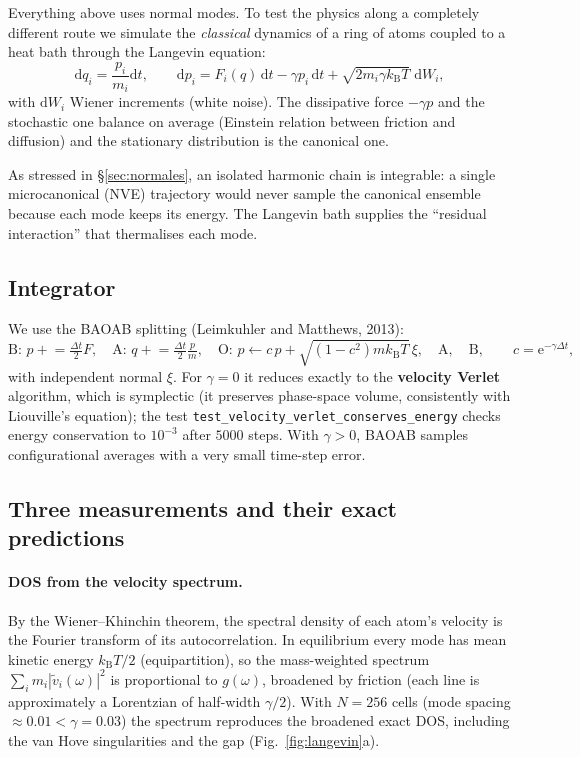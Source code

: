\documentclass[11pt,a4paper]{article}
\newcommand{\kB}{k_{\mathrm B}}
\newcommand{\dd}{\mathrm{d}}
\newcommand{\ee}{\mathrm{e}}
\newcommand{\code}[1]{\texttt{#1}}
\begin{document}
Everything above uses normal modes. To test the physics along a completely
different route we simulate the \emph{classical} dynamics of a ring of atoms
coupled to a heat bath through the Langevin equation:
\begin{equation}
\dd q_i=\frac{p_i}{m_i}\dd t,\qquad
\dd p_i=F_i(q)\,\dd t-\gamma p_i\,\dd t+\sqrt{2m_i\gamma\kB T}\;\dd W_i ,
\end{equation}
with $\dd W_i$ Wiener increments (white noise). The dissipative force
$-\gamma p$ and the stochastic one balance on average (Einstein relation between
friction and diffusion) and the stationary distribution is the canonical one.

As stressed in \S\ref{sec:normales}, an isolated harmonic chain is integrable:
a single microcanonical (NVE) trajectory would never sample the canonical
ensemble because each mode keeps its energy. The Langevin bath supplies the
``residual interaction'' that thermalises each mode.

\subsection{Integrator}

We use the BAOAB splitting (Leimkuhler and Matthews, 2013):
\[
\text{B: } p\mathrel{+}=\tfrac{\Delta t}{2}F,\quad
\text{A: } q\mathrel{+}=\tfrac{\Delta t}{2}\tfrac{p}{m},\quad
\text{O: } p\leftarrow c\,p+\sqrt{(1-c^2)m\kB T}\,\xi,\quad
\text{A},\quad \text{B},
\qquad c=\ee^{-\gamma\Delta t},
\]
with independent normal $\xi$. For $\gamma=0$ it reduces exactly to the
\textbf{velocity Verlet} algorithm, which is symplectic (it preserves phase-space
volume, consistently with Liouville's equation); the test
\code{test\_velocity\_verlet\_conserves\_energy} checks energy conservation to
$10^{-3}$ after $5000$ steps. With $\gamma>0$, BAOAB samples configurational
averages with a very small time-step error.

\subsection{Three measurements and their exact predictions}

\paragraph{DOS from the velocity spectrum.} By the Wiener–Khinchin theorem, the
spectral density of each atom's velocity is the Fourier transform of its
autocorrelation. In equilibrium every mode has mean kinetic energy $\kB T/2$
(equipartition), so the mass-weighted spectrum
$\sum_i m_i|\tilde v_i(\omega)|^2$ is proportional to $g(\omega)$, broadened by
friction (each line is approximately a Lorentzian of half-width $\gamma/2$).
With $N=256$ cells (mode spacing $\approx0.01<\gamma=0.03$) the spectrum
reproduces the broadened exact DOS, including the van Hove singularities and the
gap (Fig.~\ref{fig:langevin}a).
\end{document}
